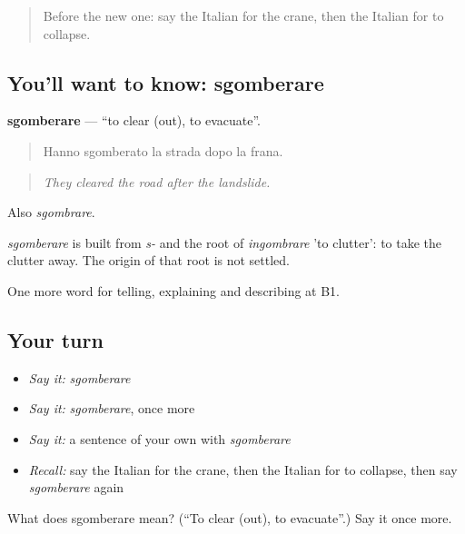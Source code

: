 \begin{quote}
Before the new one: say the Italian for the crane, then the Italian for to collapse.
\end{quote}

\subsection*{You'll want to know: sgomberare}
\textbf{sgomberare} — \textquotedblleft{}to clear (out), to evacuate\textquotedblright{}.

\begin{quote}
Hanno sgomberato la strada dopo la frana.
\end{quote}

\begin{quote}
\emph{They cleared the road after the landslide.}
\end{quote}

Also \emph{sgombrare}.

\begin{cousinweb}
\emph{sgomberare} is built from \emph{s-} and the root of \emph{ingombrare} 'to clutter': to take the clutter away. The origin of that root is not settled.
\end{cousinweb}

\begin{grammarlens}[title={What you've built}]
One more word for telling, explaining and describing at B1.
\end{grammarlens}

\subsection*{Your turn}
\begin{itemize}
\raggedright
  \item \emph{Say it:} \emph{sgomberare}
  \item \emph{Say it:} \emph{sgomberare}, once more
  \item \emph{Say it:} a sentence of your own with \emph{sgomberare}
  \item \emph{Recall:} say the Italian for the crane, then the Italian for to collapse, then say \emph{sgomberare} again
\end{itemize}

\begin{tcolorbox}[breakable,colback=teal!4,colframe=teal!35!black,title={Before you move on}]
What does sgomberare mean? (\textquotedblleft{}To clear (out), to evacuate\textquotedblright{}.) Say it once more.
\end{tcolorbox}
